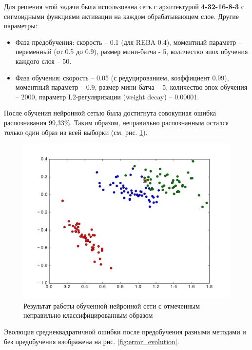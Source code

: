 Для решения этой задачи была использована сеть с архитектурой \textbf{4-32-16-8-3} с сигмоидными функциями активации на каждом обрабатывающем слое. 
Другие параметры:
\begin{itemize}
	\item Фаза предобучения: скорость -- 0.1 (для REBA 0.4), моментный параметр -- переменный (от 0.5 до 0.9), размер мини-батча - 5, количество эпох обучения каждого слоя -- 50.
	\item Фаза обучения: скорость -- 0.05 (с редуцированием, коэффициент 0.99), моментный параметр -- 0.9, размер мини-батча -- 5, количество эпох обучения -- 2000, параметр L2-регуляризации (weight decay) -- 0.00001.
\end{itemize}

После обучения нейронной сетью была достигнута совокупная ошибка распознавания 99,33\%. Таким образом, неправильно распознанным остался только один образ из всей выборки (см. рис. \ref{fig:fisher_irises_results}).

\begin{figure}[h]
	\begin{center}
		\includegraphics[width=12cm]{man-source/images/ch3/pic3-10.pdf}
		\caption{Результат работы обученной нейронной сети с отмеченным неправильно классифицированным образом}				
		\label{fig:fisher_irises_results}
	\end{center}
\end{figure}

Эволюция среднеквадратичной ошибки после предобучения разными методами и без предобучения изображена на рис. \ref{fig:error_evolution}.

